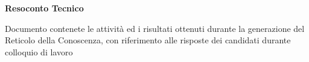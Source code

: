 \begin{center}\textbf{Resoconto Tecnico}\end{center}
\begin{center}Documento contenete le attività ed i risultati ottenuti durante la generazione del Reticolo della Conoscenza, con riferimento alle risposte dei candidati durante colloquio di lavoro\end{center}

